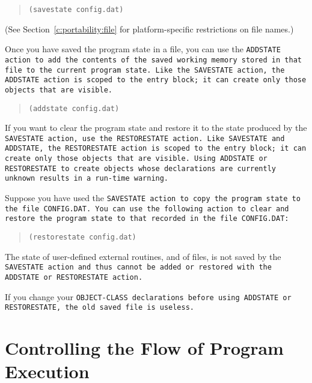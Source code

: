 \begin{quote}
\begin{verbatim}
(savestate config.dat)
\end{verbatim}
\end{quote}

(See Section~\ref{c:portability:file} for platform-specific
restrictions on file names.)

Once you have saved the program state in a file, you can use the
\tt{ADDSTATE} action to add the contents of the saved working memory
stored in that file to the current program state. Like the
\tt{SAVESTATE} action, the \tt{ADDSTATE} action is scoped to the entry
block; it can create only those objects that are visible.

\begin{quote}
\begin{verbatim}
(addstate config.dat)
\end{verbatim}
\end{quote}

If you want to clear the program state and restore it to the state
produced by the \tt{SAVESTATE} action, use the \tt{RESTORESTATE}
action.  Like \tt{SAVESTATE} and \tt{ADDSTATE}, the \tt{RESTORESTATE}
action is scoped to the entry block; it can create only those objects
that are visible.  Using \tt{ADDSTATE} or \tt{RESTORESTATE} to create
objects whose declarations are currently unknown results in a run-time
warning.

Suppose you have used the \tt{SAVESTATE} action to copy the program
state to the file \tt{CONFIG.DAT}.  You can use the following action
to clear and restore the program state to that recorded in the file
\tt{CONFIG.DAT}:

\begin{quote}
\begin{verbatim}
(restorestate config.dat)
\end{verbatim}
\end{quote}

The state of user-defined external routines, and of files, is not
saved by the \tt{SAVESTATE} action and thus cannot be added or
restored with the \tt{ADDSTATE} or \tt{RESTORESTATE} action.

If you change your \tt{OBJECT-CLASS} declarations before using
\tt{ADDSTATE} or \tt{RESTORESTATE}, the old saved file is useless.

\section{Controlling the Flow of Program Execution}

